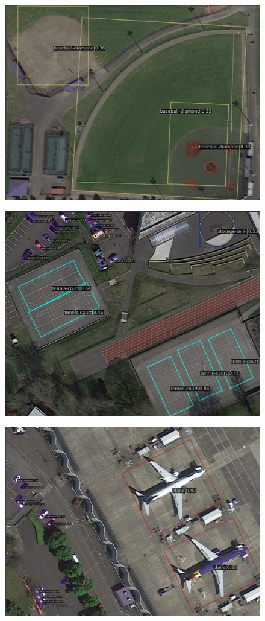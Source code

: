 \documentclass[11pt]{beamer}
\theoremstyle{definition}
\theoremstyle{plain}
\theoremstyle{plain}
\theoremstyle{remark}
\begin{document}
\begin{frame}
	\begin{figure}
		\centering
		\includegraphics[width=0.8\linewidth]{res_mmrotate4}
	
		\label{fig:resmmrotate4}
	\end{figure}
\end{frame}
\begin{frame}
	\begin{figure}
		\centering
		\includegraphics[width=0.9\linewidth]{res_mmrotate5}
	
		\label{fig:resmmrotate5}
	\end{figure}
\end{frame}
\begin{frame}
	\begin{figure}
		\centering
		\includegraphics[width=0.9\linewidth]{res_mmrotate2}
		\label{fig:resmmrotate2}
	\end{figure}
\end{frame}
\end{document}
